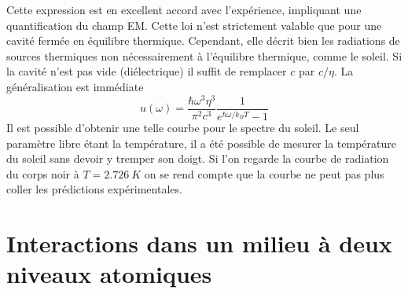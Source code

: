 	Cette expression est en excellent accord avec l'expérience, impliquant une quantification du champ EM. 
	Cette loi n'est strictement valable que pour une cavité fermée en équilibre thermique. Cependant, elle 
	décrit bien les radiations de sources thermiques non nécessairement à l'équilibre thermique, comme le 
	soleil. Si la cavité n'est pas vide (diélectrique) il suffit de remplacer $c$ par $c/\eta$. La 
	généralisation est immédiate
	\begin{equation}
	u(\omega) = \dfrac{\hbar\omega^3\eta^3}{\pi^2c^3}\dfrac{1}{e^{\hbar\omega/k_BT}-1}
	\end{equation}
	Il est possible d'obtenir une telle courbe pour le spectre du soleil. Le seul paramètre libre étant la 
	température, il a été possible de mesurer la température du soleil sans devoir y tremper son doigt. Si 
	l'on regarde la courbe de radiation du corps noir à $T=2.726\ K$ on se rend compte que la courbe 
	ne peut pas plus coller les prédictions expérimentales.
	
	
	
	\newpage
	\section{Interactions dans un milieu à deux niveaux atomiques}
	
	
	
	
	
	
	
	
	
	
	
	
	
	